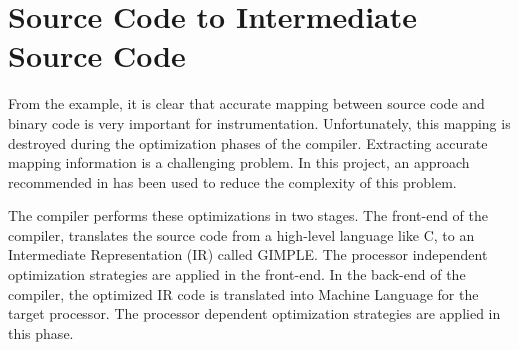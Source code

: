 %
%
%

\section{Source Code to Intermediate Source Code}
From the example, it is clear that accurate mapping between source code and binary code is very important for instrumentation. Unfortunately, this mapping is destroyed during the optimization phases of the compiler. Extracting accurate mapping information is a challenging problem. In this project, an approach recommended in \cite{RBA2013} has been used to reduce the complexity of this problem.

The compiler performs these optimizations in two stages. The front-end of the compiler, translates the source code from a high-level language like C, to an Intermediate Representation (IR) called GIMPLE. The processor independent optimization strategies are applied in the front-end. In the back-end of the compiler, the optimized IR code is translated into Machine Language for the target processor. The processor dependent optimization strategies are applied in this phase.

